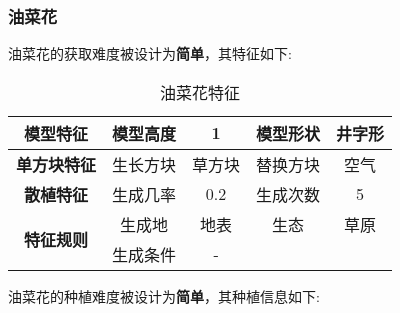 \subsubsection{油菜花}

油菜花的获取难度被设计为\textbf{简单}，其特征如下:
\begin{table}[H]
    \centering
    \caption{油菜花特征}
    \label{table:油菜花特征}
    \setlength{\tabcolsep}{4mm}
    \begin{tabular}{c|cc|cc}
        \toprule
        \textbf{模型特征}                  & 模型高度 & 1      & 模型形状 & 井字形 \\
        \midrule
        \textbf{单方块特征}                & 生长方块 & 草方块 & 替换方块 & 空气   \\
        \midrule
        \textbf{散植特征}                  & 生成几率 & 0.2    & 生成次数 & 5      \\
        \midrule
        \multirow{2}{*}{\textbf{特征规则}} & 生成地   & 地表   & 生态     & 草原   \\
                                           & 生成条件 & -                       \\
        \bottomrule
    \end{tabular}
\end{table}


油菜花的种植难度被设计为\textbf{简单}，其种植信息如下:

